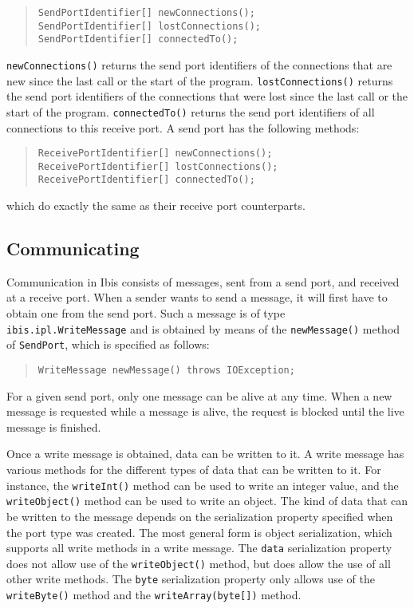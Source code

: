 \documentclass[10pt]{article}
\newcommand{\mysubsection}[1]{\subsection{#1}\label{#1}}
\begin{document}
\begin{quote}
\begin{verbatim}
SendPortIdentifier[] newConnections();
SendPortIdentifier[] lostConnections();
SendPortIdentifier[] connectedTo();
\end{verbatim}
\end{quote}

\texttt{newConnections()} returns the send port identifiers of the connections
that are new since the last call or the start of the program.
\texttt{lostConnections()} returns the send port identifiers of the connections
that were lost since the last call or the start of the program.
\texttt{connectedTo()} returns the send port identifiers of all connections
to this receive port.
A send port has the following methods:

\begin{quote}
\begin{verbatim}
ReceivePortIdentifier[] newConnections();
ReceivePortIdentifier[] lostConnections();
ReceivePortIdentifier[] connectedTo();
\end{verbatim}
\end{quote}
\noindent
which do exactly the same as their receive port counterparts.

\mysubsection{Communicating}

Communication in Ibis
consists of messages, sent from a send port, and received at a
receive port. When a sender wants to send a message, it will first
have to obtain one from the send port. Such a message is of
type \texttt{ibis.ipl.WriteMessage} and is obtained by means of
the \texttt{newMessage()} method of \texttt{SendPort}, which is specified
as follows:

\begin{quote}
\begin{verbatim}
WriteMessage newMessage() throws IOException;
\end{verbatim}
\end{quote}

\noindent
For a given send port, only one message can be alive at any time.
When a new message is requested while a message is alive, the request
is blocked until the live message is finished.

Once a write message is obtained, data can be written to it.
A write message has various methods for the different types of
data that can be written to it. For instance, the
\texttt{writeInt()} method can be used to write an integer value,
and the \texttt{writeObject()} method can be used to write an object.
The kind of data that can be written to the message depends on the
serialization property specified when the port type was created.
The most general form is object serialization, which supports 
all write methods in a write message.
The \texttt{data} serialization property does not allow use of the
\texttt{writeObject()} method, but does allow the use of all other write
methods. The \texttt{byte} serialization property only allows use
of the \texttt{writeByte()} method and the \texttt{writeArray(byte[])}
method.
\end{document}
